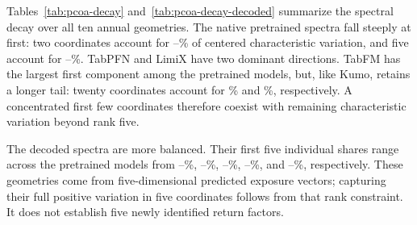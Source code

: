 \documentclass[11pt]{article}
\begin{document}
Tables~\ref{tab:pcoa-decay} and~\ref{tab:pcoa-decay-decoded} summarize the
spectral decay over all ten annual geometries. The native pretrained spectra
fall steeply at first: two coordinates account for
\PcoaNativeTwoMin--\PcoaNativeTwoMax\% of centered characteristic variation,
and five account for \PcoaNativeFiveMin--\PcoaNativeFiveMax\%.
TabPFN and LimiX have two dominant directions. TabFM has the largest first
component among the pretrained models, but, like Kumo, retains a longer tail:
twenty coordinates account for \PcoaTabfmTwenty\% and \PcoaKumoTwenty\%,
respectively. A concentrated first few coordinates therefore coexist with
remaining characteristic variation beyond rank five.

\begin{table}[p]
  \centering\small\setlength{\tabcolsep}{4pt}
  
  \caption{Native principal-coordinate spectral decay. Entries are percentages
    of centered characteristic-geometry variation, averaged without weighting
    across the separately fitted annual PCoAs for 2016--2025. PC1--PC5 give
    individual shares; First 5 and First 10 give cumulative shares. These are
    neither a spectrum fitted to pooled years nor shares of return
  variation.}\label{tab:pcoa-decay}
\end{table}

The decoded spectra are more balanced. Their first five individual shares range
across the pretrained models from \PcoaDecodedOneMin--\PcoaDecodedOneMax\%,
\PcoaDecodedTwoMin--\PcoaDecodedTwoMax\%,
\PcoaDecodedThreeMin--\PcoaDecodedThreeMax\%,
\PcoaDecodedFourMin--\PcoaDecodedFourMax\%, and
\PcoaDecodedFiveMin--\PcoaDecodedFiveMax\%, respectively.
These geometries come from five-dimensional predicted exposure vectors;
capturing their full positive variation in five coordinates follows from that
rank constraint. It does not establish five newly identified return factors.

\begin{table}[p]
  \centering\small
  
  \caption{Decoded pretrained principal-coordinate spectral decay. Entries
    are unweighted mean annual percentages for 2016--2025, with PCoA fitted
    separately each year. Five components exhaust the positive
    characteristic-geometry spectrum by the five-dimensional construction.
    They measure variation in decoded exposure geometry, not explained return
    variation or evidence from a single pooled
  PCoA.}\label{tab:pcoa-decay-decoded}
\end{table}
\end{document}
